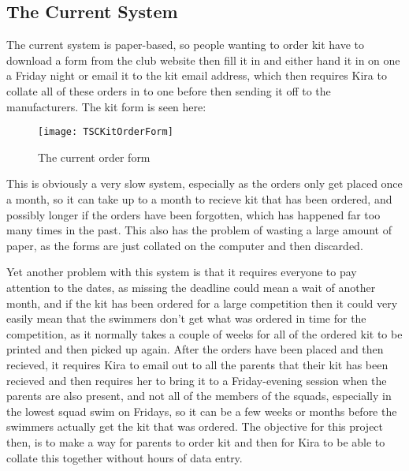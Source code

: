 \documentclass[
11pt, %
a4paper, %
oneside, %
headinclude,footinclude, %
BCOR5mm, %
]{scrartcl}
\begin{document}
\subsection{The Current System}
The current system is paper-based, so people wanting to order kit have to download a form from the club website then fill it in and either hand it in on one a Friday night or email it to the kit email address, which then requires Kira to collate all of these orders in to one before then sending it off to the manufacturers. The kit form is seen here:
\par 
\begin{figure}[h]
	\centering
	\texttt{[image: TSCKitOrderForm]}
	\caption{The current order form}
	\label{TSCOrderForm}
\end{figure}
\par This is obviously a very slow system, especially as the orders only get placed once a month, so it can take up to a month to recieve kit that has been ordered, and possibly longer if the orders have been forgotten, which has happened far too many times in the past. This also has the problem of wasting a large amount of paper, as the forms are just collated on the computer and then discarded. \par 
Yet another problem with this system is that it requires everyone to pay attention to the dates, as missing the deadline could mean a wait of another month, and if the kit has been ordered for a large competition then it could very easily mean that the swimmers don't get what was ordered in time for the competition, as it normally takes a couple of weeks for all of the ordered kit to be printed and then picked up again. After the orders have been placed and then recieved, it requires Kira to email out to all the parents that their kit has been recieved and then requires her to bring it to a Friday-evening session when the parents are also present, and not all of the members of the squads, especially in the lowest squad swim on Fridays, so it can be a few weeks or months before the swimmers actually get the kit that was ordered. The objective for this project then, is to make a way for parents to order kit and then for Kira to be able to collate this together without hours of data entry.
\end{document}
